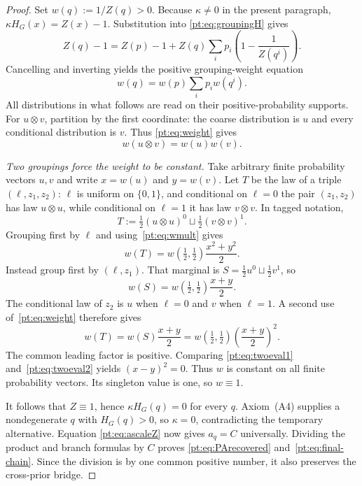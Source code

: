 \begin{proof}
Set $w(q):=1/Z(q)>0$.  Because $\kappa\ne0$ in the present paragraph,
$\kappa H_G(x)=Z(x)-1$.  Substitution into
\eqref{pt:eq:groupingH} gives
\[
 Z(q)-1=Z(p)-1+
 Z(q)\sum_i p_i\left(1-\frac1{Z(q^i)}\right).
\]
Cancelling and inverting yields the positive grouping-weight equation
\begin{equation}
 w(q)=w(p)\sum_i p_iw(q^i).
\tag{W}\label{pt:eq:weight}
\end{equation}
All distributions in what follows are read on their positive-probability
supports.  For $u\otimes v$, partition by the first coordinate: the coarse
distribution is $u$ and every conditional distribution is $v$.  Thus
\eqref{pt:eq:weight} gives
\begin{equation}
 w(u\otimes v)=w(u)w(v).
\tag{M}\label{pt:eq:wmult}
\end{equation}

\emph{Two groupings force the weight to be constant.}
Take arbitrary finite probability vectors $u,v$ and write
$x=w(u)$ and $y=w(v)$.  Let $T$ be the law of a triple
$(\ell,z_1,z_2)$: $\ell$ is uniform on $\{0,1\}$, and conditional on
$\ell=0$ the pair $(z_1,z_2)$ has law $u\otimes u$, while conditional on
$\ell=1$ it has law $v\otimes v$.  In tagged notation,
\[
 T:=\tfrac12(u\otimes u)^0\sqcup\tfrac12(v\otimes v)^1.
\]
Grouping first by $\ell$ and using~\eqref{pt:eq:wmult} gives
\begin{equation}
 w(T)=w(\tfrac12,\tfrac12)\frac{x^2+y^2}{2}.
\tag{E1}\label{pt:eq:twoeval1}
\end{equation}
Instead group first by $(\ell,z_1)$.  That marginal is
$S=\tfrac12u^0\sqcup\tfrac12v^1$, so
\[
 w(S)=w(\tfrac12,\tfrac12)\frac{x+y}{2}.
\]
The conditional law of $z_2$ is $u$ when $\ell=0$ and $v$ when $\ell=1$.
A second use of~\eqref{pt:eq:weight} therefore gives
\begin{equation}
 w(T)=w(S)\frac{x+y}{2}
 =w(\tfrac12,\tfrac12)\left(\frac{x+y}{2}\right)^2.
\tag{E2}\label{pt:eq:twoeval2}
\end{equation}
The common leading factor is positive.  Comparing
\eqref{pt:eq:twoeval1} and~\eqref{pt:eq:twoeval2} yields $(x-y)^2=0$.
Thus $w$ is constant on all finite probability vectors.  Its singleton value
is one, so $w\equiv1$.

It follows that $Z\equiv1$, hence $\kappa H_G(q)=0$ for every $q$.
Axiom~\textup{(A4)} supplies a nondegenerate $q$ with $H_G(q)>0$, so
$\kappa=0$, contradicting the temporary alternative.  Equation
\eqref{pt:eq:ascaleZ} now gives $a_q=C$ universally.
Dividing the product and branch formulas by $C$ proves
\eqref{pt:eq:PArecovered} and~\eqref{pt:eq:final-chain}.  Since the division
is by one common positive number, it also preserves the cross-prior bridge.
\end{proof}

